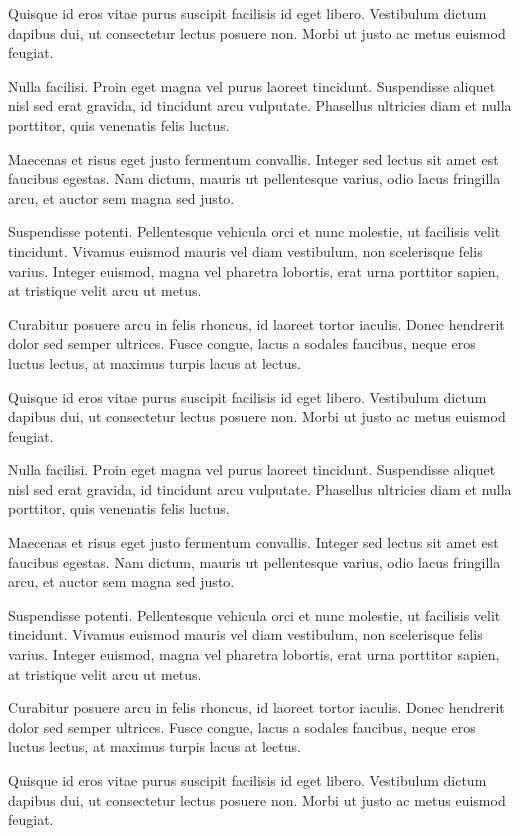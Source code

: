 Quisque id eros vitae purus suscipit facilisis id eget libero. Vestibulum dictum dapibus dui, ut consectetur lectus posuere non. Morbi ut justo ac metus euismod feugiat.

Nulla facilisi. Proin eget magna vel purus laoreet tincidunt. Suspendisse aliquet nisl sed erat gravida, id tincidunt arcu vulputate. Phasellus ultricies diam et nulla porttitor, quis venenatis felis luctus.

Maecenas et risus eget justo fermentum convallis. Integer sed lectus sit amet est faucibus egestas. Nam dictum, mauris ut pellentesque varius, odio lacus fringilla arcu, et auctor sem magna sed justo.

Suspendisse potenti. Pellentesque vehicula orci et nunc molestie, ut facilisis velit tincidunt. Vivamus euismod mauris vel diam vestibulum, non scelerisque felis varius. Integer euismod, magna vel pharetra lobortis, erat urna porttitor sapien, at tristique velit arcu ut metus.

Curabitur posuere arcu in felis rhoncus, id laoreet tortor iaculis. Donec hendrerit dolor sed semper ultrices. Fusce congue, lacus a sodales faucibus, neque eros luctus lectus, at maximus turpis lacus at lectus.

Quisque id eros vitae purus suscipit facilisis id eget libero. Vestibulum dictum dapibus dui, ut consectetur lectus posuere non. Morbi ut justo ac metus euismod feugiat.

Nulla facilisi. Proin eget magna vel purus laoreet tincidunt. Suspendisse aliquet nisl sed erat gravida, id tincidunt arcu vulputate. Phasellus ultricies diam et nulla porttitor, quis venenatis felis luctus.

Maecenas et risus eget justo fermentum convallis. Integer sed lectus sit amet est faucibus egestas. Nam dictum, mauris ut pellentesque varius, odio lacus fringilla arcu, et auctor sem magna sed justo.

Suspendisse potenti. Pellentesque vehicula orci et nunc molestie, ut facilisis velit tincidunt. Vivamus euismod mauris vel diam vestibulum, non scelerisque felis varius. Integer euismod, magna vel pharetra lobortis, erat urna porttitor sapien, at tristique velit arcu ut metus.

Curabitur posuere arcu in felis rhoncus, id laoreet tortor iaculis. Donec hendrerit dolor sed semper ultrices. Fusce congue, lacus a sodales faucibus, neque eros luctus lectus, at maximus turpis lacus at lectus.

Quisque id eros vitae purus suscipit facilisis id eget libero. Vestibulum dictum dapibus dui, ut consectetur lectus posuere non. Morbi ut justo ac metus euismod feugiat.

